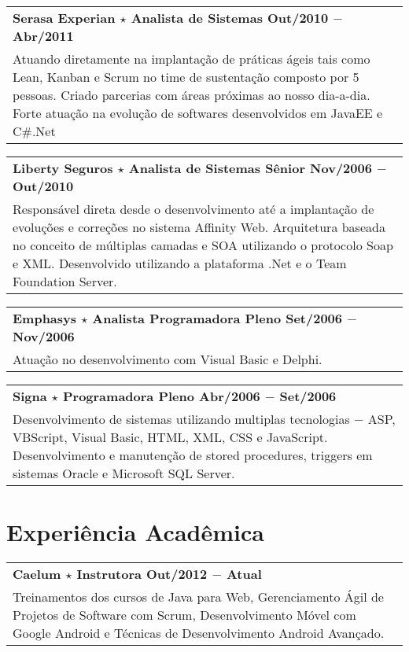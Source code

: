 \documentclass[a4paper, oneside, final]{scrartcl}
\newcommand{\vspc}{\vspace{0.15cm}} %
\begin{document}
\begin{center}
\begin{tabularx}{1\linewidth}{X}
{\bf Serasa Experian $\star$  Analista de Sistemas \hfill Out/2010 $-$ Abr/2011} \\
Atuando diretamente na implantação de práticas ágeis tais como Lean, Kanban e Scrum no time de sustentação composto por 5 pessoas. Criado parcerias com áreas próximas ao nosso dia-a-dia. Forte atuação na evolução de softwares desenvolvidos em JavaEE e C\#.Net \vspc\\
\end{tabularx}

\begin{tabularx}{1\linewidth}{X}
{\bf Liberty Seguros $\star$ Analista de Sistemas Sênior \hfill Nov/2006 $-$ Out/2010} \\
Responsável direta desde o desenvolvimento até a implantação de evoluções e correções no sistema Affinity Web. Arquitetura baseada no conceito de múltiplas camadas e SOA utilizando o protocolo Soap e XML. Desenvolvido utilizando a plataforma .Net e o Team Foundation Server.\vspc\\
\end{tabularx}

\begin{tabularx}{1\linewidth}{X}
{\bf Emphasys $\star$ Analista Programadora Pleno  \hfill Set/2006 $-$ Nov/2006} \\
Atuação no desenvolvimento com Visual Basic e Delphi. \vspc\\
\end{tabularx}

\begin{tabularx}{1\linewidth}{X}
{\bf Signa $\star$ Programadora Pleno  \hfill Abr/2006 $-$ Set/2006} \\
Desenvolvimento de sistemas utilizando multiplas tecnologias $-$ ASP, VBScript, Visual Basic, HTML, XML, CSS e JavaScript. Desenvolvimento e manutenção de stored procedures, triggers em sistemas Oracle e Microsoft SQL Server. \vspc\\
\end{tabularx}

\section{Experiência Acadêmica}
\begin{tabularx}{1\linewidth}{X}
{\bf Caelum $\star$ Instrutora \hfill Out/2012 $-$ Atual} \\
Treinamentos dos cursos de Java para Web, Gerenciamento Ágil de Projetos de Software com Scrum, Desenvolvimento Móvel com Google Android e Técnicas de Desenvolvimento Android Avançado. \vspc\\
\end{tabularx}


\end{center}
\end{document}
